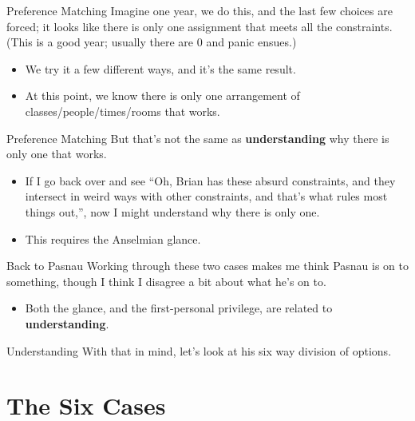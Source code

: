 \documentclass[
  17pt,
  letterpaper,
  ignorenonframetext,
  aspectratio=169,
]{beamer}
\providecommand{\tightlist}{%
  \setlength{\itemsep}{0pt}\setlength{\parskip}{0pt}}\usepackage{longtable,booktabs,array}
\begin{document}
\begin{frame}{Preference Matching}
\protect\hypertarget{preference-matching-2}{}
Imagine one year, we do this, and the last few choices are forced; it
looks like there is only one assignment that meets all the constraints.
(This is a good year; usually there are 0 and panic ensues.)

\begin{itemize}[<+->]
\tightlist
\item
  We try it a few different ways, and it's the same result.
\item
  At this point, we know there is only one arrangement of
  classes/people/times/rooms that works.
\end{itemize}
\end{frame}

\begin{frame}{Preference Matching}
\protect\hypertarget{preference-matching-3}{}
But that's not the same as \textbf{understanding} why there is only one
that works.

\begin{itemize}[<+->]
\tightlist
\item
  If I go back over and see ``Oh, Brian has these absurd constraints,
  and they intersect in weird ways with other constraints, and that's
  what rules most things out,'', now I might understand why there is
  only one.
\item
  This requires the Anselmian glance.
\end{itemize}
\end{frame}

\begin{frame}{Back to Pasnau}
\protect\hypertarget{back-to-pasnau}{}
Working through these two cases makes me think Pasnau is on to
something, though I think I disagree a bit about what he's on to.

\begin{itemize}[<+->]
\tightlist
\item
  Both the glance, and the first-personal privilege, are related to
  \textbf{understanding}.
\end{itemize}
\end{frame}

\begin{frame}{Understanding}
\protect\hypertarget{understanding}{}
With that in mind, let's look at his six way division of options.
\end{frame}

\hypertarget{the-six-cases}{%
\section{The Six Cases}\label{the-six-cases}}
\end{document}
